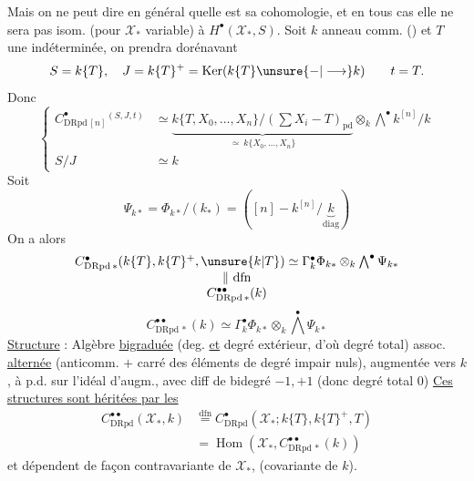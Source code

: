 Mais on ne peut dire en général quelle est sa cohomologie,  et en tous cas elle ne sera pas isom. (pour $\mathcal X_*$ variable) à $H^\bullet(\mathcal X_*,S)$.
Soit $k$ anneau comm. () et $T$ une indéterminée, on prendra dorénavant
\[
S=k\{T\},\quad J=k\{T\}^+=\operatorname{Ker}(k\{T\}\unsure{-|\longrightarrow}k)
\qquad t=T.
\]
Donc
\[
\left\{\begin{aligned}
C^\bullet_{\mathrm{DRpd}\,[n]}{}^{(S,J,t)}&\simeq
\underbrace{k\{T,X_0,\ldots,X_n\}/(\textstyle\sum X_i-T)_{\mathrm{pd}}}_{\displaystyle\simeq\ k\{X_0,\ldots,X_n\}}
\otimes_k\bigwedge^\bullet k^{[n]}/k\\
S/J&\simeq k
\end{aligned}\right.
\]
Soit
\[
\Psi_{k*}=\Phi_{k*}/(k_*)=([n]\mathbin{-}k^{[n]}/\underbrace{k}_{\mathrm{diag}})
\]
On a alors
\[
\begin{array}{c}
C^\bullet_{\mathrm{DRpd}\,*}(k\{T\},k\{T\}^+,\unsure{k|T})\simeq\Gamma^\bullet_k\Phi_{k*}\otimes_k\bigwedge^\bullet\Psi_{k*}\\
\Vert\ \mathrm{dfn}\\
C^{\bullet\bullet}_{\mathrm{DRpd}\,*}(k)
\end{array}
\]
\[
\boxed{C^{\bullet\bullet}_{\mathrm{DRpd}\,*}(k)\simeq\Gamma^\bullet_k\Phi_{k*}\otimes_k\bigwedge^\bullet\Psi_{k*}}
\]
\uline{Structure} : Algèbre  \uline{bigraduée} (deg.  \uline{et} degré extérieur, d'où degré total)  assoc.  \uline{alternée} (anticomm. $+$ carré des éléments de degré impair nuls), augmentée vers $k$, à p.d. sur l'idéal d'augm., avec diff de bidegré $-1,+1$ (donc degré total 0) 
\uline{Ces structures sont héritées par les}
\[
\boxed{\begin{aligned}
C^{\bullet\bullet}_{\mathrm{DRpd}}(\mathcal X_*,k)&\overset{\mathrm{dfn}}=C^\bullet_{\mathrm{DRpd}}(\mathcal X_*;k\{T\},k\{T\}^+,T)\\
&=\operatorname{Hom}(\mathcal X_*,C^{\bullet\bullet}_{\mathrm{DRpd}\,*}(k))
\end{aligned}}
\]
et dépendent de façon contravariante de $\mathcal X_*$, (covariante de $k$).

